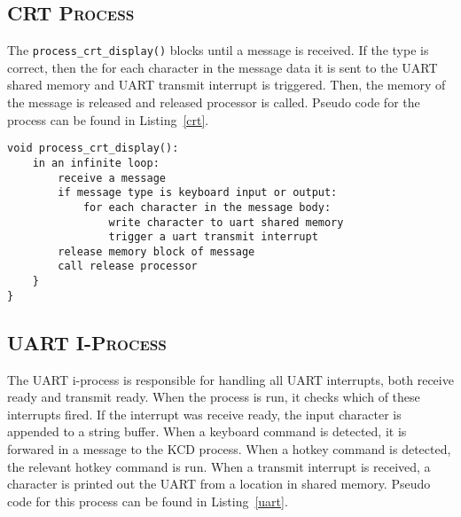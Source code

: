 \documentclass[oneside]{report}
\begin{document}
\subsection{\textsc{CRT Process}}
The \texttt{process\_crt\_display()} blocks until a message is
received. If the type is correct, then the for each character in the message 
data it is sent to the UART shared memory and UART transmit interrupt is 
triggered. Then, the memory of the message is released and released processor is 
called. Pseudo code for the process can be found in Listing~\ref{crt}.

\begin{lstlisting}
void process_crt_display():
    in an infinite loop:
        receive a message
        if message type is keyboard input or output:
            for each character in the message body:
                write character to uart shared memory
                trigger a uart transmit interrupt
        release memory block of message
        call release processor
    }
}
\end{lstlisting}

\subsection{\textsc{UART I-Process}}

The UART i-process is responsible for handling all UART interrupts,
both receive ready and transmit ready. When the process is run, it
checks which of these interrupts fired. If the interrupt was receive
ready, the input character is appended to a string buffer. When a
keyboard command is detected, it is forwared in a message to the KCD
process. When a hotkey command is detected, the relevant hotkey
command is run. When a transmit interrupt is received, a character is
printed out the UART from a location in shared memory. Pseudo code for
this process can be found in Listing~\ref{uart}.
\end{document}

